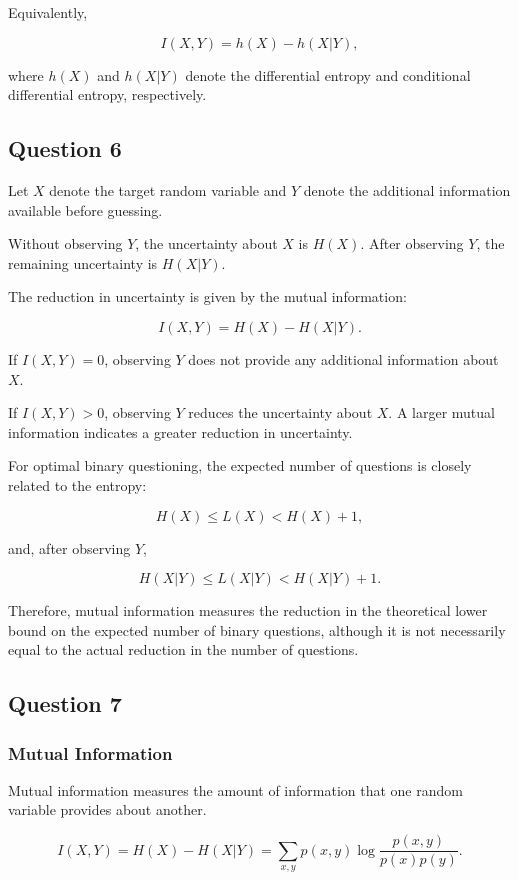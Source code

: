 \documentclass[10pt,a4paper]{article}
\begin{document}
		Equivalently,
		
		\[
		I(X,Y)=h(X)-h(X|Y),
		\]
		
		where $h(X)$ and $h(X|Y)$ denote the differential entropy
		and conditional differential entropy, respectively.
		
		
		\subsection{Question 6}
		Let $X$ denote the target random variable and $Y$ denote
		the additional information available before guessing.
		
		Without observing $Y$, the uncertainty about $X$ is $H(X)$.
		After observing $Y$, the remaining uncertainty is $H(X|Y)$.
		
		The reduction in uncertainty is given by the mutual information:
		
		\[
		I(X,Y)=H(X)-H(X|Y).
		\]
		
		If $I(X,Y)=0$, observing $Y$ does not provide any additional
		information about $X$.
		
		If $I(X,Y)>0$, observing $Y$ reduces the uncertainty about $X$.
		A larger mutual information indicates a greater reduction
		in uncertainty.
		
		For optimal binary questioning, the expected number of
		questions is closely related to the entropy:
		
		\[
		H(X)\leq L(X)<H(X)+1,
		\]
		
		and, after observing $Y$,
		
		\[
		H(X|Y)\leq L(X|Y)<H(X|Y)+1.
		\]
		
		Therefore, mutual information measures the reduction
		in the theoretical lower bound on the expected number
		of binary questions, although it is not necessarily
		equal to the actual reduction in the number of questions.
		\subsection{Question 7}
		\subsubsection{Mutual Information}
		
		Mutual information measures the amount of information that
		one random variable provides about another.
		
		\[
		I(X,Y)=H(X)-H(X|Y)
		=\sum_{x,y}p(x,y)\log
		\frac{p(x,y)}{p(x)p(y)}.
		\]
		
\end{document}
